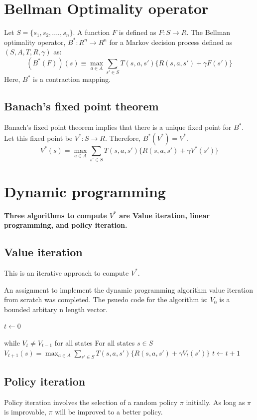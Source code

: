 \documentclass[12pt]{article}
\begin{document}
\section{Bellman Optimality operator}

Let $S=\{s_1, s_2, ...., s_n\}$. A function $F$ is defined as $F:S\to R$. 
The Bellman optimality operator, $B^*:R^n \to R^n$ for a Markov decision process defined as $(S,A,T,R,\gamma)$ as:
\begin{equation}
	(B^*(F))(s)\equiv \max_{a\in A}\sum_{s'\in S}T(s,a,s')\{R(s,a,s')+\gamma F(s')\}
\end{equation}
Here, $B^*$ is a contraction mapping. 

\subsection{Banach's fixed point theorem}

Banach's fixed point theorem implies that there is a unique fixed point for $B^*$. Let this fixed point be $V^*:S\to R$. Therefore, $B^*(V^*)=V^*$.
\begin{equation}
	V^*(s)= \max_{a\in A}\sum_{s'\in S}T(s,a,s')\{R(s,a,s')+\gamma V^*(s')\}
\end{equation}

\section{Dynamic programming}
\textbf{Three algorithms to compute $V^*$ are Value iteration, linear programming, and policy iteration.}


\subsection{Value iteration}
This is an iterative approach to compute $V^*$.

An assignment to implement the dynamic programming algorithm value iteration from scratch was completed. The psuedo code for the algorithm is:
$V_0$ is a bounded arbitary n length vector.

$t \leftarrow 0$ 

while $V_t \neq V_{t-1}$ for all states
For all states $s \in S$\\
$V_{t+1}(s)=\max_{a\in A}\sum_{s'\in S}T(s,a,s')\{R(s,a,s')+\gamma V_t(s')\}$
$t \leftarrow t+1$

\subsection{Policy iteration}
Policy iteration involves the selection of a random policy $\pi$ initially. As long as $\pi$ is improvable, $\pi$ will be improved to a better policy. 
\end{document}
